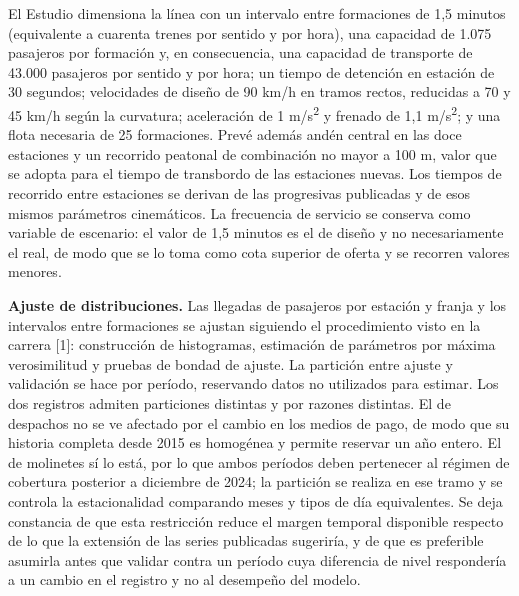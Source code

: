 \documentclass{article}
\begin{document}
El Estudio dimensiona la línea con un intervalo entre
formaciones de 1,5 minutos (equivalente a cuarenta trenes por sentido y por hora), una capacidad de
1.075 pasajeros por formación y, en consecuencia, una capacidad de transporte de 43.000 pasajeros por
sentido y por hora; un tiempo de detención en estación de 30 segundos; velocidades de diseño de 90 km/h en
tramos rectos, reducidas a 70 y 45 km/h según la curvatura; aceleración de 1 m/s\textsuperscript{2} y
frenado de 1,1 m/s\textsuperscript{2}; y una flota necesaria de 25 formaciones. Prevé además andén central
en las doce estaciones y un recorrido peatonal de combinación no mayor a 100 m, valor que se adopta para el
tiempo de transbordo de las estaciones nuevas. Los tiempos de recorrido entre estaciones se derivan de las
progresivas publicadas y de esos mismos parámetros cinemáticos. La frecuencia de
servicio se conserva como variable de escenario: el valor de 1,5 minutos es el de diseño y no
necesariamente el real, de modo que se lo toma como cota superior de oferta y se recorren
valores menores.

\textbf{Ajuste de distribuciones.} Las llegadas de pasajeros por estación y franja y los intervalos entre
formaciones se ajustan siguiendo el procedimiento visto en la carrera [1]: construcción de histogramas,
estimación de parámetros por máxima verosimilitud y pruebas de bondad de ajuste. La partición entre ajuste y
validación se hace por período, reservando datos no utilizados para estimar. Los dos registros admiten
particiones distintas y por razones distintas. El de despachos no se ve afectado por el cambio en los medios
de pago, de modo que su historia completa desde 2015 es homogénea y permite reservar un año entero. El de
molinetes sí lo está, por lo que ambos períodos deben pertenecer al régimen de cobertura posterior a
diciembre de 2024; la partición se realiza en ese tramo y se controla la estacionalidad comparando meses y
tipos de día equivalentes. Se deja constancia de que esta restricción reduce el margen temporal disponible
respecto de lo que la extensión de las series publicadas sugeriría, y de que es preferible asumirla antes
que validar contra un período cuya diferencia de nivel respondería a un cambio en el registro y no al
desempeño del modelo.
\end{document}
